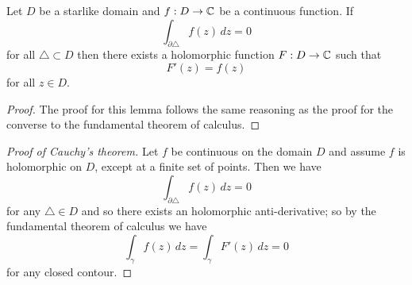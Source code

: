 
\begin{lemma}[]
    Let $D$ be a starlike domain and $f: D \to \mathbb{C}$
    be a continuous function.
    If
    \[
        \int_{\partial \triangle} f(z) \,dz = 0
    \]
    for all $\triangle \subset D$
    then there exists a holomorphic function 
    $F: D \to \mathbb{C}$
    such that
    \[
        F'(z) = f(z)
    \]
    for all $z \in D$.
\end{lemma}

\begin{proof}
    The proof for this lemma follows the same reasoning
    as the proof for the converse to the fundamental theorem
    of calculus.
\end{proof}

\begin{proof}[Proof of Cauchy's theorem]
    Let $f$ be continuous on the domain $D$
    and assume $f$ is holomorphic on $D$,
    except at a finite set of points.
    Then we have 
    \[
        \int_{\partial \triangle} f(z) \, dz = 0
    \]
    for any $\triangle \in D$
    and so there exists an holomorphic anti-derivative;
    so by the fundamental theorem of calculus we have
    \[
        \int_\gamma f(z) \,dz = \int_\gamma F'(z) \,dz = 0
    \]
    for any closed contour.
\end{proof}
